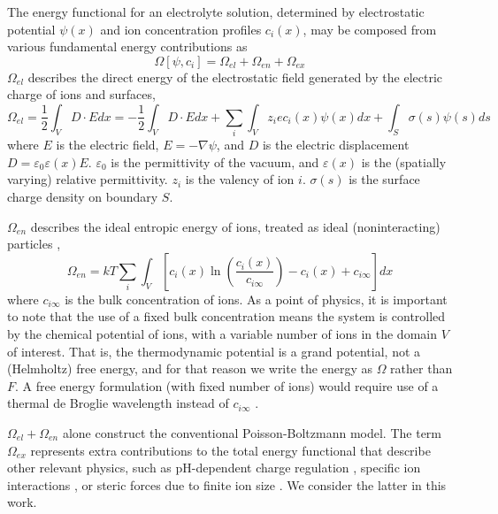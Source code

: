 The energy functional for an electrolyte solution, determined by
electrostatic potential $\psi(x)$ and ion concentration profiles
$c_i(x)$, may be composed from various fundamental energy
contributions as
\begin{equation}
    \Omega[\psi, c_i] = \Omega_{el} + \Omega_{en} +  \Omega_{ex}
\end{equation}
$\Omega_{el}$ describes the direct energy of the electrostatic field generated by the electric charge of ions and surfaces, \cite{Jackson}
\begin{equation}
  \Omega_{el}  =\frac{1}{2} \int_{V}D \cdot E dx
  = -\frac{1}{2} \int_{V}D \cdot E dx + \sum_i \int_V z_i e c_i(x) \psi(x) dx
  + \int_{S} \sigma(s) \psi(s) ds
\end{equation}
where $E$ is the electric field, $E=-\nabla\psi$, and $D$ is the
electric displacement $D=\varepsilon_0
\varepsilon(x)E$. $\varepsilon_0$ is the permittivity of the vacuum,
and $\varepsilon(x)$ is the (spatially varying) relative
permittivity. $z_i$ is the valency of ion $i$.  $\sigma(s)$ is the
surface charge density on boundary $S$.

$\Omega_{en}$ describes the ideal entropic energy of ions, treated as ideal (noninteracting) particles \cite{GrayStiles2018,DagmawiParsons2024},
\begin{equation}
    \Omega_{en} = kT \sum_{i} \int_{V} \left[ c_i(x) \ln \left(\frac{c_i(x)}{c_{i\infty}} \right) - c_{i}(x) + c_{i\infty} \right] dx 
\end{equation}
where $c_{i\infty}$ is the bulk concentration of ions. As a point of
physics, it is important to note that the use of a fixed bulk
concentration means the system is controlled by the chemical potential
of ions, with a variable number of ions in the domain $V$ of interest.
That is, the thermodynamic potential is a grand potential, not a
(Helmholtz) free energy, and for that reason we write the energy as $\Omega$ rather
than $F$. A free energy formulation (with fixed number of ions) would
require use of a thermal de Broglie wavelength instead of
$c_{i\infty}$ \cite{GrayStiles2018}.

$\Omega_{el} + \Omega_{en}$ alone construct the conventional
Poisson-Boltzmann model. The term $\Omega_{ex}$ represents extra
contributions to the total energy functional that describe other
relevant physics, such as pH-dependent charge regulation
\cite{ParsonsSalis2019}, specific ion interactions
\cite{ParsonsCarucciSalis2022}, or steric forces due to finite ion
size \cite{LopezGarciaHornoGrosse2018}. We consider the latter in this
work.

